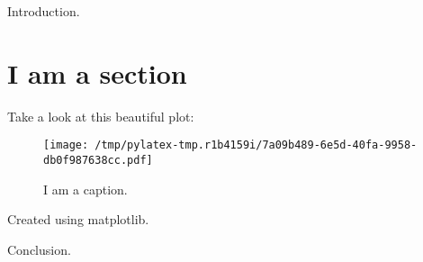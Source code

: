 \documentclass{article}%
\begin{document}
%
\normalsize%
Introduction.%
\section{I am a section}%
\label{sec:Iamasection}%
Take a look at this beautiful plot:%


\begin{figure}[htbp]%
\centering%
\texttt{[image: /tmp/pylatex-tmp.r1b4159i/7a09b489-6e5d-40fa-9958-db0f987638cc.pdf]}%
\caption{I am a caption.}%
\end{figure}

%
Created using matplotlib.

%
Conclusion.%
\end{document}
